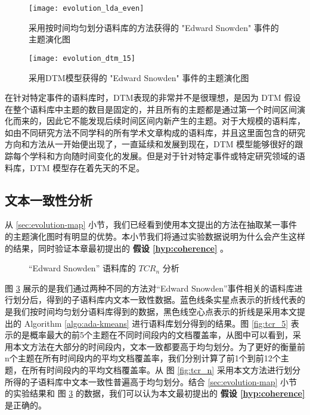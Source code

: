 \begin{figure}[htb]
	\centering
	\texttt{[image: evolution\_lda\_even]}
	\caption{采用按时间均匀划分语料库的方法获得的 "Edward Snowden" 事件的主题演化图}
	\label{fig:evolution-even}
\end{figure}
\begin{figure}[htb]
	\centering
	\texttt{[image: evolution\_dtm\_15]}
	\caption{采用DTM模型获得的 "Edward Snowden" 事件的主题演化图}
	\label{fig:evolution-dtm}
\end{figure}
在针对特定事件的语料库时，DTM表现的非常并不是很理想，是因为 DTM 假设在整个语料库中主题的数目是固定的，并且所有的主题都是通过第一个时间区间演化而来的，因此它不能发现后续时间区间内新产生的主题。对于大规模的语料库，如由不同研究方法不同学科的所有学术文章构成的语料库，并且这里面包含的研究方向和方法从一开始便出现了，一直延续和发展到现在，DTM 模型能够很好的跟踪每个学科和方向随时间变化的发展。但是对于针对特定事件或特定研究领域的语料库，DTM 模型存在着先天的不足。

\subsection{文本一致性分析}
从 \ref{sec:evolution-map} 小节，我们已经看到使用本文提出的方法在抽取某一事件的主题演化图时有明显的优势。本小节我们将通过实验数据说明为什么会产生这样的结果，同时验证本章最初提出的 \textbf{假设 \ref{hyp:coherence}} 。
\label{sec:coherence-result}
\begin{figure}[htb]
	\centering
	\caption{“Edward Snowden” 语料库的 $TCR_n$ 分析}
	\label{fig:tcr}
\end{figure}

图 \ref{fig:tcr} 展示的是我们通过两种不同的方法对“Edward Snowden”事件相关的语料库进行划分后，得到的子语料库内文本一致性数据。蓝色线条实星点表示的折线代表的是我们按时间均匀划分语料库得到的数据，黑色线空心点表示的折线是采用本文提出的 Algorithm \ref{algo:ada-kmeans} 进行语料库划分得到的结果。图 \ref{fig:tcr_5} 表示的是概率最大的前5个主题在不同时间段内的文档覆盖率，从图中可以看到，采用本文方法在大部分的时间段内，文本一致都要高于均匀划分。为了更好的衡量前n个主题在所有时间段内的平均文档覆盖率，我们分别计算了前1个到前12个主题，在所有时间段内的平均文档覆盖率。从 图 \ref{fig:tcr_n} 采用本文方法进行划分所得的子语料库中文本一致性普遍高于均匀划分。结合 \ref{sec:evolution-map} 小节的实验结果和 图 \ref{fig:tcr} 的数据，我们可以认为本文最初提出的 \textbf{假设 \ref{hyp:coherence}} 是正确的。 

